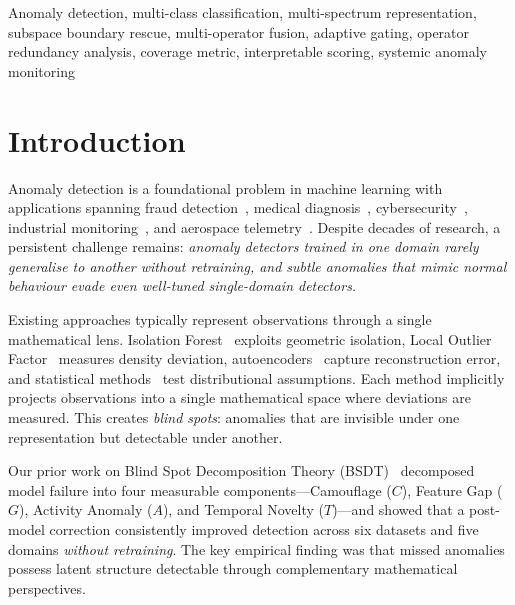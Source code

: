 \documentclass[journal]{IEEEtran}
\begin{document}
\begin{IEEEkeywords}
Anomaly detection, multi-class classification, multi-spectrum representation, subspace boundary rescue, multi-operator fusion, adaptive gating, operator redundancy analysis, coverage metric, interpretable scoring, systemic anomaly monitoring
\end{IEEEkeywords}

\section{Introduction}
\label{sec:introduction}

Anomaly detection is a foundational problem in machine learning with applications spanning fraud detection~\cite{ahmed2016survey}, medical diagnosis~\cite{fernando2021deep}, cybersecurity~\cite{chandola2009anomaly}, industrial monitoring~\cite{pang2021deep}, and aerospace telemetry~\cite{hundman2018detecting}. Despite decades of research, a persistent challenge remains: \textit{anomaly detectors trained in one domain rarely generalise to another without retraining, and subtle anomalies that mimic normal behaviour evade even well-tuned single-domain detectors.}

Existing approaches typically represent observations through a single mathematical lens. Isolation Forest~\cite{liu2008isolation} exploits geometric isolation, Local Outlier Factor~\cite{breunig2000lof} measures density deviation, autoencoders~\cite{an2015variational} capture reconstruction error, and statistical methods~\cite{chandola2009anomaly} test distributional assumptions. Each method implicitly projects observations into a single mathematical space where deviations are measured. This creates \textit{blind spots}: anomalies that are invisible under one representation but detectable under another.

Our prior work on Blind Spot Decomposition Theory (BSDT)~\cite{odeyemi2025bsdt} decomposed model failure into four measurable components---Camouflage ($C$), Feature Gap ($G$), Activity Anomaly ($A$), and Temporal Novelty ($T$)---and showed that a post-model correction consistently improved detection across six datasets and five domains \textit{without retraining}. The key empirical finding was that missed anomalies possess latent structure detectable through complementary mathematical perspectives.
\end{document}

